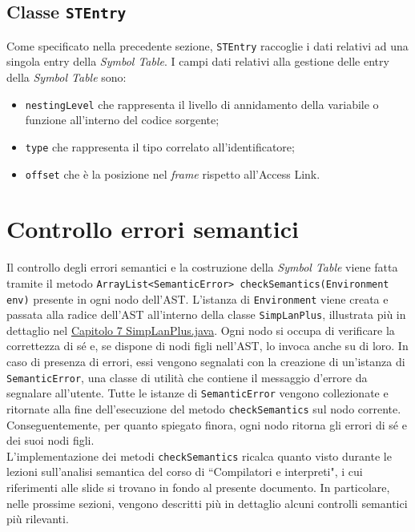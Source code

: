 \documentclass[../report.tex]{subfiles}
\begin{document}
\subsection[Classe STEntry]{Classe \texttt{STEntry}}\label{ss:stentry}
Come specificato nella precedente sezione, \verb|STEntry| raccoglie i dati relativi ad una singola entry della \textit{Symbol Table}.
I campi dati relativi alla gestione delle entry della \textit{Symbol Table} sono:
\begin{itemize}
    \item \verb|nestingLevel| che rappresenta il livello di annidamento della variabile o funzione all'interno del codice sorgente;
    \item \verb|type| che rappresenta il tipo correlato all'identificatore;
    \item \verb|offset| che è la posizione nel \textit{frame} rispetto all'Access Link.
\end{itemize}

\section{Controllo errori semantici}\label{s:controllo-errori-semantici}
Il controllo degli errori semantici e la costruzione della \textit{Symbol Table} viene fatta tramite il metodo \verb|ArrayList<SemanticError> checkSemantics(Environment env)| presente in ogni nodo dell'AST.
L'istanza di \verb|Environment| viene creata e passata alla radice dell'AST all'interno della classe \verb|SimpLanPlus|, illustrata più in dettaglio nel \hyperref[c:simplanplus-java]{Capitolo 7 SimpLanPlus.java}.
Ogni nodo si occupa di verificare la correttezza di sé e, se dispone di nodi figli nell'AST, lo invoca anche su di loro.
In caso di presenza di errori, essi vengono segnalati con la creazione di un'istanza di \verb|SemanticError|, una classe di utilità che contiene il messaggio d'errore da segnalare all'utente.
Tutte le istanze di \verb|SemanticError| vengono collezionate e ritornate alla fine dell'esecuzione del metodo \verb|checkSemantics| sul nodo corrente.
Conseguentemente, per quanto spiegato finora, ogni nodo ritorna gli errori di sé e dei suoi nodi figli.\\
\noindent
L'implementazione dei metodi \verb|checkSemantics| ricalca quanto visto durante le lezioni sull'analisi semantica del corso di ``Compilatori e interpreti", i cui riferimenti alle slide si trovano in fondo al presente documento.
In particolare, nelle prossime sezioni, vengono descritti più in dettaglio alcuni controlli semantici più rilevanti.
\end{document}
